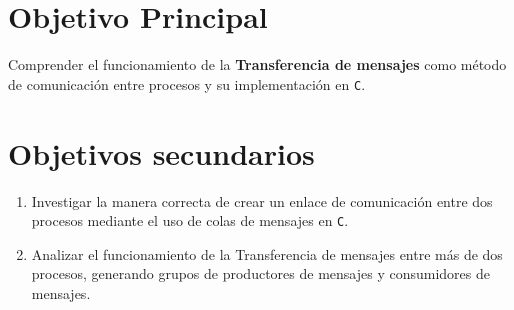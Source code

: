 \section{Objetivo Principal}
Comprender el funcionamiento de la \textbf{Transferencia de mensajes} como método de comunicación entre procesos y su implementación en \texttt{C}.

\section{Objetivos secundarios}
\begin{enumerate}
    \item Investigar la manera correcta de crear un enlace de comunicación entre dos procesos mediante el uso de colas de mensajes en \texttt{C}.
    \item Analizar el funcionamiento de la Transferencia de mensajes entre más de dos procesos, generando grupos de productores de mensajes y consumidores de mensajes.
\end{enumerate}